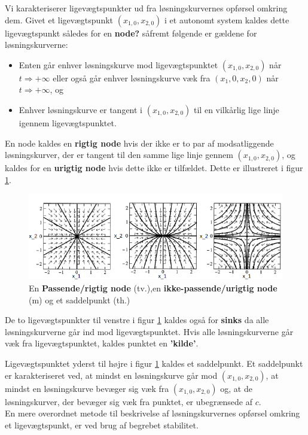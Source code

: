 \hfill \break
Vi karakteriserer ligevægtspunkter ud fra løsningskurvernes opførsel omkring dem. Givet et ligevægtspunkt $(x_{1,0},x_{2,0})$ i et autonomt system kaldes dette ligevægtspunkt således for en \textbf{node?} såfremt følgende er gældene for løsningskurverne:
\begin{itemize}
    \item Enten går enhver løsningskurve mod ligevægtspunktet $(x_{1,0},x_{2,0})$ når $t \Rightarrow + \infty$ eller også går enhver løsningskurve væk fra $(x_1,0,x_2,0)$ når $t \Rightarrow + \infty$, og
    \item Enhver løsningskurve er tangent i $(x_{1,0},x_{2,0})$ til en vilkårlig lige linje igennem ligevægtspunktet.  
\end{itemize}
En node kaldes en \textbf{rigtig node} hvis der ikke er to par af modsatliggende løsningskurver, der er tangent til den samme lige linje gennem $(x_{1,0},x_{2,0})$, og kaldes for en \textbf{urigtig node} hvis dette ikke er tilfældet. Dette er illustreret i figur \ref{noder}.
\begin{figure} [H]
    \centering
    \includegraphics[scale=0.8]{Images/noder.png}
    \caption{En \textbf{Passende/rigtig node} (tv.),en \textbf{ikke-passende/urigtig node} (m) og et saddelpunkt (th.) }
    \label{noder}
\end{figure}

De to ligevægtspunkter til venstre i figur \ref{noder} kaldes også for \textbf{sinks} da alle løsningskurverne går ind mod ligevægtspunktet. Hvis alle løsningskurverne går væk fra ligevægtspunktet, kaldes punktet en \textbf{'kilde'}.

Ligevægtspunktet yderst til højre i figur \ref{noder} kaldes et saddelpunkt. Et saddelpunkt er karakteriseret ved, at mindst en løsningskurve går mod $(x_{1,0},x_{2,0})$, at mindst en løsningskurve bevæger sig væk fra $(x_{1,0},x_{2,0})$ og, at de løsningskurver, der bevæger sig væk fra punktet, er ubegrænsede af $c$.
\\
En mere overordnet metode til beskrivelse af løsningskurvernes opførsel omkring et ligevægtspunkt, er ved brug af begrebet stabilitet.

